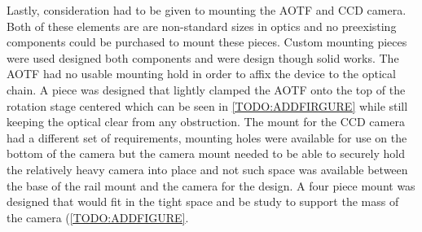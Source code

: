 Lastly, consideration had to be given to mounting the AOTF and CCD camera. Both of these elements are are non-standard sizes in optics and no preexisting components could be purchased to mount these pieces. Custom mounting pieces were used designed both components and were design though solid works. The AOTF had no usable mounting hold in order to affix the device to the optical chain. A piece was designed that lightly clamped the AOTF onto the top of the rotation stage centered which can be seen in \autoref{TODO:ADDFIRGURE} while still keeping the optical clear from any obstruction. The mount for the CCD camera had a different set of requirements, mounting holes were available for use on the bottom of the camera but the camera mount needed to be able to securely hold the relatively heavy camera into place and not such space was available between the base of the rail mount and the camera for the design. A four piece mount was designed that would fit in the tight space and be study to support the mass of the camera (\autoref{TODO:ADDFIGURE}.      